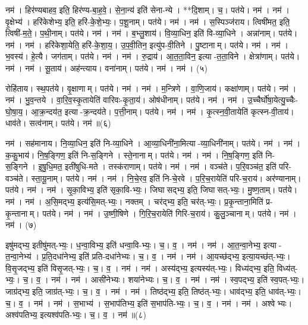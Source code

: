 नम॑। हिर॑ण्यबाहव॒ इति॒ हिर॑ण्य-बा॒ह॒वे॒। से॒ना॒न्य॑ इति॑ सेना-न्ये। **दि॒शाम्। च॒। पत॑ये। नम॑। 
नम॑। वृ॒क्षेभ्य॑। हरि॑केशेभ्य॒ इति॒ हरि॑-के॒शे॒भ्यः॒। प॒शू॒नाम्। पत॑ये। नम॑। 
नम॑। स॒स्पिञ्ज॑राय। त्विषी॑मत॒ इति॒ त्विषी॑-म॒ते॒। प॒थी॒नाम्। पत॑ये। नम॑। 
नम॑। ब॒भ्लु॒शाय॑। वि॒व्या॒धिन॒ इति॑ वि-व्या॒धिने। अन्ना॑नाम्। पत॑ये। नम॑। 
नम॑। हरि॑केशा॒येति॒ हरि॑-के॒शा॒य॒। उ॒प॒वी॒तिन॒ इत्यु॑प-वी॒तिने। पु॒ष्टानाम्। पत॑ये। नम॑। 
नम॑। भ॒वस्य॑। हे॒त्यै। जग॑ताम्। पत॑ये। नम॑। 
नम॑। रु॒द्राय॑। आ॒त॒ता॒विन॒ इत्या-त॒ता॒विने। क्षेत्रा॑णाम्। पत॑ये। नम॑। 
नम॑। सू॒ताय॑। अह॑न्त्याय। वना॑नाम्। पत॑ये। नम॑। 
नम॑। (५)


रोहि॑ताय। स्थ॒पत॑ये। वृ॒क्षाणाम्। पत॑ये। नम॑। 
नम॑। म॒न्त्रिणे। वा॒णि॒जाय॑। कक्षा॑णाम्। पत॑ये। नम॑। 
नम॑। भु॒व॒न्तये। वा॒रि॒व॒स्कृ॒तायेति॑ वारिवः-कृ॒ता॒य॑। ओष॑धीनाम्। पत॑ये। नम॑। 
नम॑। उ॒च्चैर्घो॑षा॒येत्यु॒च्चैः-घो॒षा॒य॒। आ॒क्र॒न्दय॑त॒ इत्या-क्र॒न्दय॑ते। प॒त्ती॒नाम्। पत॑ये। नम॑। 
नम॑। कृ॒त्स्न॒वी॒तायेति॑ कृत्स्न-वी॒ताय॑। धाव॑ते। सत्व॑नाम्। पत॑ये। नम॑॥(६)


नम॑। सह॑मानाय। नि॒व्या॒धिन॒ इति॑ नि-व्या॒धिने। आ॒व्या॒धिनी॑ना॒मित्या-व्या॒धिनी॑नाम्। पत॑ये। नम॑। 
नम॑। क॒कु॒भाय॑। नि॒ष॒ङ्गिण॒ इति॑ नि-स॒ङ्गिने। स्ते॒नानाम्। पत॑ये। नम॑। 
नम॑। नि॒ष॒ङ्गिण॒ इति॑ नि-स॒ङ्गिने। इ॒षु॒धि॒मत॒ इती॑षुधि-मते। तस्क॑राणाम्। पत॑ये। नम॑। 
नम॑। वञ्च॑ते। प॒रि॒वञ्च॑त॒ इति॑ परि-वञ्च॑ते। स्ता॒यू॒नाम्। पत॑ये। नम॑। 
नम॑। नि॒चे॒रव॒ इति॑ नि-चे॒रवे। प॒रि॒च॒रायेति॑ परि-च॒राय॑। अर॑ण्यानाम्। पत॑ये। नम॑। 
नम॑। सृ॒का॒विभ्य॒ इति॑ सृका॒वि-भ्यः॒। जिघासद्भ्य॒ इति॒ जिघासत्-भ्यः॒। मु॒ष्ण॒ताम्। पत॑ये। नम॑। 
नम॑। अ॒सि॒मद्भ्य॒ इत्य॑सि॒मत्-भ्यः॒। नक्तम्। चर॑द्भ्य॒ इति॒ चर॑त्-भ्यः॒। प्र॒कृ॒न्ताना॒मिति॑ प्र-कृ॒न्तानाम्। पत॑ये। नम॑। 
नम॑। उ॒ष्णी॒षिणे। गि॒रि॒च॒रायेति॑ गिरि-च॒राय॑। कु॒लु॒ञ्चानाम्। पत॑ये। नम॑। नम॑। (७)


इषु॑मद्भ्य॒ इतीषु॑मत्-भ्यः॒। ध॒न्वा॒विभ्य॒ इति॑ धन्वा॒वि-भ्यः॒। च॒। व॒। नम॑। 
नम॑। आ॒त॒न्वा॒नेभ्य॒ इत्या-त॒न्वा॒नेभ्य॑। प्र॒ति॒दधा॑नेभ्य॒ इति॑ प्रति-दधा॑नेभ्यः। च॒। व॒। नम॑। 
नम॑। आ॒यच्छ॑द्भ्य॒ इत्या॒यच्छ॑त्-भ्यः॒। वि॒सृ॒जद्भ्य॒ इति॑ विसृ॒जत्-भ्यः॒। च॒। व॒। नम॑। 
नम॑। अस्य॑द्भ्य॒ इत्यस्य॑त्-भ्यः॒। विध्य॑द्भ्य॒ इति॒ विध्य॑त्-भ्यः॒। च॒। व॒। नम॑। 
नम॑। आसी॑नेभ्यः। शया॑नेभ्यः। च॒। व॒। नम॑। 
नम॑। स्व॒पद्भ्य॒ इति॑ स्व॒पत्-भ्यः॒। जाग्र॑द्भ्य॒ इति॒ जाग्र॑त्-भ्यः॒। च॒। व॒। नम॑। 
नम॑। तिष्ठ॑द्भ्य॒ इति॒ तिष्ठ॑त्-भ्यः॒। धाव॑द्भ्य॒ इति॒ धाव॑त्-भ्यः॒। च॒। व॒। नम॑। 
नम॑। स॒भाभ्य॑। स॒भाप॑तिभ्य॒ इति॑ स॒भाप॑ति-भ्यः॒। च॒। व॒। नम॑। 
नम॑। अश्वेभ्यः। अश्व॑पतिभ्य॒ इत्यश्व॑पति-भ्यः॒। च॒। व॒। नम॑॥(८)



